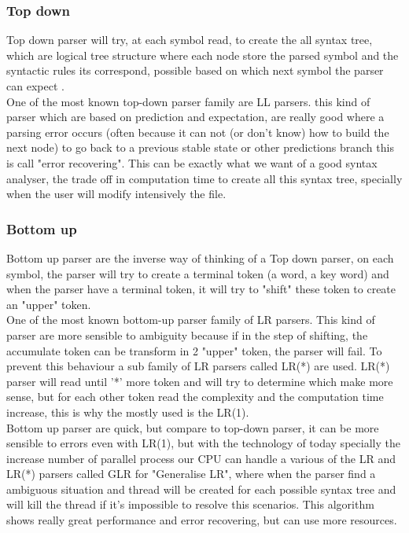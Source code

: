 \subsubsection{Top down}
Top down parser will try, at each symbol read, to create the all syntax tree, which are logical tree structure where each node store the parsed symbol and the syntactic rules its correspond, possible based on which next symbol the parser can expect \cite{knuth1971top}\cite{grune2008parsing}. 
\\One of the most known top-down parser family are LL parsers. this kind of parser which are based on prediction and expectation, are really good where a parsing error occurs (often because it can not (or don't know) how to build the next node) to go back to a previous stable state or other predictions branch this is call "error recovering"\cite{panopticoncentral_2009}. This can be exactly what we want of a good syntax analyser, the trade off in computation time to create all this syntax tree, specially when the user will modify intensively the file.

\subsubsection{Bottom up}
Bottom up parser are the inverse way of thinking of a Top down parser, on each symbol, the parser will try to create a terminal token (a word, a key word) and when the parser have a terminal token, it will try to "shift" these token to create an "upper" token\cite{knuth1971top}\cite{grune2008parsing}.
\\One of the most known bottom-up parser family of LR parsers. This kind of parser are more sensible to ambiguity because if in the step of shifting, the accumulate token can be transform in 2 "upper" token, the parser will fail. To prevent this behaviour a sub family of LR parsers called LR(*) are used. LR(*) parser will read until '*' more token and will try to determine which make more sense, but for each other token read the complexity and the computation time increase, this is why the mostly used is the LR(1).
\\Bottom up parser are quick, but compare to top-down parser, it can be more sensible to errors even with LR(1), but with the technology of today specially the increase number of parallel process our CPU can handle a various of the LR and LR(*) parsers called GLR for "Generalise LR", where when the parser find a ambiguous situation and thread will be created for each possible syntax tree\cite{panopticoncentral_2009} and will kill the thread if it's impossible to resolve this scenarios. This algorithm shows really great performance and error recovering, but can use more resources.

